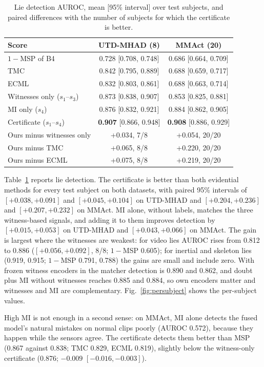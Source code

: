 \documentclass[conference]{IEEEtran}
\begin{document}
\begin{table}[t]
\centering
\caption{Lie detection AUROC, mean [95\% interval] over test subjects, and paired differences with the number of subjects for which the certificate is better.}
\label{tab:detect}
\setlength{\tabcolsep}{4pt}
\begin{tabular}{lcc}
\toprule
Score & UTD-MHAD (8) & MMAct (20) \\
\midrule
$1-$MSP of B4 & 0.728 [0.708, 0.748] & 0.686 [0.664, 0.709] \\
TMC & 0.842 [0.795, 0.889] & 0.688 [0.659, 0.717] \\
ECML & 0.832 [0.803, 0.861] & 0.688 [0.663, 0.714] \\
Witnesses only ($s_1$--$s_3$) & 0.873 [0.838, 0.907] & 0.853 [0.825, 0.881] \\
MI only ($s_4$) & 0.876 [0.832, 0.921] & 0.884 [0.862, 0.905] \\
Certificate ($s_1$--$s_4$) & \textbf{0.907} [0.866, 0.948] & \textbf{0.908} [0.886, 0.929] \\
\midrule
Ours minus witnesses only & +0.034, 7/8 & +0.054, 20/20 \\
Ours minus TMC & +0.065, 8/8 & +0.220, 20/20 \\
Ours minus ECML & +0.075, 8/8 & +0.219, 20/20 \\
\bottomrule
\end{tabular}
\end{table}

Table~\ref{tab:detect} reports lie detection. The certificate is better than both evidential methods for every test subject on both datasets, with paired 95\% intervals of $[+0.038, +0.091]$ and $[+0.045, +0.104]$ on UTD-MHAD and $[+0.204, +0.236]$ and $[+0.207, +0.232]$ on MMAct. MI alone, without labels, matches the three witness-based signals, and adding it to them improves detection by $[+0.015, +0.053]$ on UTD-MHAD and $[+0.043, +0.066]$ on MMAct. The gain is largest where the witnesses are weakest: for video lies AUROC rises from 0.812 to 0.886 ($[+0.056, +0.092]$, 8/8; $1-$MSP 0.605); for inertial and skeleton lies (0.919, 0.915; $1-$MSP 0.791, 0.788) the gains are small and include zero. With frozen witness encoders in the matcher detection is 0.890 and 0.862, and doubt plus MI without witnesses reaches 0.885 and 0.884, so own encoders matter and witnesses and MI are complementary. Fig.~\ref{fig:persubject} shows the per-subject values.

High MI is not enough in a second sense: on MMAct, MI alone detects the fused model's natural mistakes on normal clips poorly (AUROC 0.572), because they happen while the sensors agree. The certificate detects them better than MSP (0.867 against 0.838; TMC 0.829, ECML 0.819), slightly below the witness-only certificate (0.876; $-0.009$ $[-0.016, -0.003]$).
\end{document}
